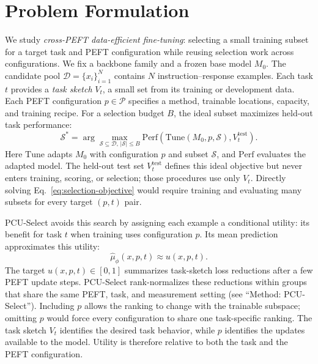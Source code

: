 \section{Problem Formulation}
\label{sec:problem}

We study \emph{cross-PEFT data-efficient fine-tuning}: selecting a small training subset for a target task and PEFT configuration while reusing selection work across configurations. We fix a backbone family and a frozen base model $M_0$. The candidate pool $\mathcal{D}=\{x_i\}_{i=1}^{N}$ contains $N$ instruction--response examples. Each task $t$ provides a \emph{task sketch} $V_t$, a small set from its training or development data. Each PEFT configuration $p\in\mathcal{P}$ specifies a method, trainable locations, capacity, and training recipe. For a selection budget $B$, the ideal subset maximizes held-out task performance:
\begin{equation}
  \mathcal{S}^{*}=\arg\max_{\mathcal{S}\subseteq\mathcal{D},\,|\mathcal{S}|\le B}
  \mathrm{Perf}\!\left(\mathrm{Tune}(M_0,p,\mathcal{S}),V_t^{\mathrm{test}}\right).
  \label{eq:selection-objective}
\end{equation}
Here $\mathrm{Tune}$ adapts $M_0$ with configuration $p$ and subset $\mathcal{S}$, and $\mathrm{Perf}$ evaluates the adapted model. The held-out test set $V_t^{\mathrm{test}}$ defines this ideal objective but never enters training, scoring, or selection; those procedures use only $V_t$. Directly solving Eq.~\eqref{eq:selection-objective} would require training and evaluating many subsets for every target $(p,t)$ pair.

PCU-Select avoids this search by assigning each example a conditional utility: its benefit for task $t$ when training uses configuration $p$. Its mean prediction approximates this utility:
\begin{equation}
  \widehat{\mu}_{\phi}(x,p,t)\approx u(x,p,t).
  \label{eq:surrogate}
\end{equation}
The target $u(x,p,t)\in[0,1]$ summarizes task-sketch loss reductions after a few PEFT update steps. PCU-Select rank-normalizes these reductions within groups that share the same PEFT, task, and measurement setting (see ``Method: PCU-Select''). Including $p$ allows the ranking to change with the trainable subspace; omitting $p$ would force every configuration to share one task-specific ranking. The task sketch $V_t$ identifies the desired task behavior, while $p$ identifies the updates available to the model. Utility is therefore relative to both the task and the PEFT configuration.

